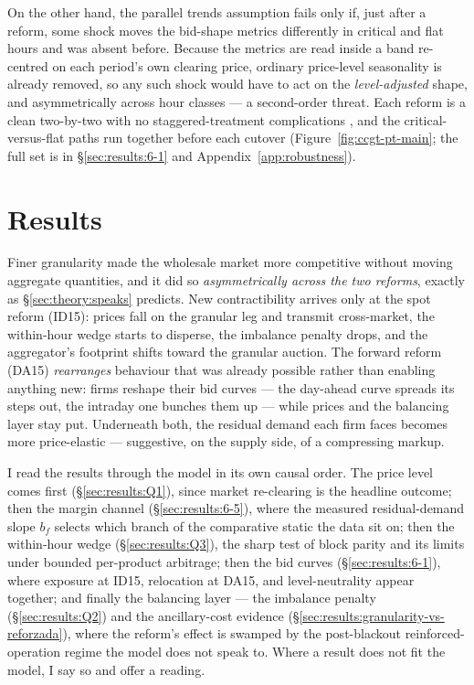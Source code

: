 \documentclass[11pt,a4paper]{article}
\theoremstyle{definition}
\theoremstyle{remark}
\theoremstyle{plain}
\begin{document}
On the other hand, the parallel trends assumption fails only if, just after a reform, some shock moves the bid-shape metrics differently in critical and flat hours and was absent before. Because the metrics are read inside a band re-centred on each period's own clearing price, ordinary price-level seasonality is already removed, so any such shock would have to act on the \emph{level-adjusted} shape, and asymmetrically across hour classes --- a second-order threat. Each reform is a clean two-by-two with no staggered-treatment complications \citep[ch.~3]{de_chaisemartin_2026}, and the critical-versus-flat paths run together before each cutover (Figure~\ref{fig:ccgt-pt-main}; the full set is in \S\ref{sec:results:6-1} and Appendix~\ref{app:robustness}).

\section{Results}\label{sec:results}

\begin{takeaway}
Finer granularity made the wholesale market more competitive without moving aggregate quantities, and it did so \emph{asymmetrically across the two reforms}, exactly as \S\ref{sec:theory:speaks} predicts. New contractibility arrives only at the spot reform (ID15): prices fall on the granular leg and transmit cross-market, the within-hour wedge starts to disperse, the imbalance penalty drops, and the aggregator's footprint shifts toward the granular auction. The forward reform (DA15) \emph{rearranges} behaviour that was already possible rather than enabling anything new: firms reshape their bid curves --- the day-ahead curve spreads its steps out, the intraday one bunches them up --- while prices and the balancing layer stay put. Underneath both, the residual demand each firm faces becomes more price-elastic --- suggestive, on the supply side, of a compressing markup.
\end{takeaway}


\noindent I read the results through the model in its own causal order. The price level comes first (\S\ref{sec:results:Q1}), since market re-clearing is the headline outcome; then the margin channel (\S\ref{sec:results:6-5}), where the measured residual-demand slope $b_f$ selects which branch of the comparative static the data sit on; then the within-hour wedge (\S\ref{sec:results:Q3}), the sharp test of block parity and its limits under bounded per-product arbitrage; then the bid curves (\S\ref{sec:results:6-1}), where exposure at ID15, relocation at DA15, and level-neutrality appear together; and finally the balancing layer --- the imbalance penalty (\S\ref{sec:results:Q2}) and the ancillary-cost evidence (\S\ref{sec:results:granularity-vs-reforzada}), where the reform's effect is swamped by the post-blackout reinforced-operation regime the model does not speak to. Where a result does not fit the model, I say so and offer a reading.
\end{document}
